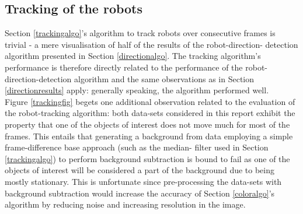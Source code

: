 \documentclass[10pt,a4paper]{article}
\begin{document}
\subsection{Tracking of the robots}\label{trackingresults}
Section \ref{trackingalgo}'s algorithm to track robots over consecutive frames
is trivial - a mere visualisation of half of the results of the robot-direction-
detection algorithm presented in Section \ref{directionalgo}. The tracking 
algorithm's performance is therefore directly related to the performance of 
the robot-direction-detection algorithm and the same observations as in Section
\ref{directionresults} apply: generally speaking, the algorithm performed 
well.\\
Figure \ref{trackingfig} begets one additional observation related to the
evaluation of the robot-tracking algorithm: both data-sets considered in this
report exhibit the property that one of the objects of interest does not move
much for most of the frames. This entails that generating a background from
data employing a simple frame-difference base approach (such as the median-
filter used in Section \ref{trackingalgo}) to perform background subtraction 
is bound to  fail as one of the objects of interest will be considered a part 
of the background due to being mostly stationary. This is unfortunate since
pre-processing the data-sets with background subtraction would increase the
accuracy of Section \ref{coloralgo}'s algorithm by reducing noise and increasing
resolution in the image.
\end{document}
